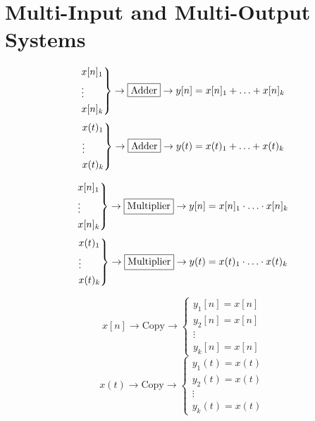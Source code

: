 \section{Multi-Input and Multi-Output Systems}

\begin{definition}

    $$ \begin{rcases}
        x[n]_1 \\
        \vdots \\
        x[n]_k \end{rcases} \to \boxed{\text{Adder}} \to y[n] = x[n]_1 +\ldots + x[n]_k $$
    $$ \begin{rcases}
        x(t)_1 \\
        \vdots \\
        x(t)_k \end{rcases} \to \boxed{\text{Adder}} \to y(t) = x(t)_1 +\ldots + x(t)_k $$

\end{definition}

\begin{definition}
    $$ \begin{rcases}
        x[n]_1 \\
        \vdots \\
        x[n]_k \end{rcases} \to \boxed{\text{Multiplier}} \to y[n] = x[n]_1 \cdot \ldots \cdot x[n]_k $$
    $$ \begin{rcases}
        x(t)_1 \\
        \vdots \\
        x(t)_k \end{rcases} \to \boxed{\text{Multiplier}} \to y(t) = x(t)_1 \cdot \ldots \cdot x(t)_k $$

\end{definition}

\begin{definition}
    $$x[n] \to \boxed{\text{Copy}} \to \begin{cases}
        y_1[n] = x[n] \\
        y_2[n] = x[n] \\
        \vdots \\
        y_k[n] = x[n] \end{cases}$$
    $$x(t) \to \boxed{\text{Copy}} \to \begin{cases}
        y_1(t) = x(t) \\
        y_2(t) = x(t) \\
        \vdots \\
        y_k(t) = x(t) \end{cases}$$
\end{definition}


